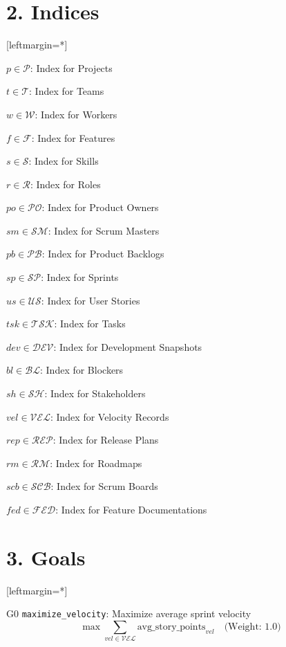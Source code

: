 \documentclass[12pt]{article}
\begin{document}
\section{2. Indices}
[leftmargin=*]
    \item $ p \in \mathcal{P} $: Index for Projects
    \item $ t \in \mathcal{T} $: Index for Teams
    \item $ w \in \mathcal{W} $: Index for Workers
    \item $ f \in \mathcal{F} $: Index for Features
    \item $ s \in \mathcal{S} $: Index for Skills
    \item $ r \in \mathcal{R} $: Index for Roles
    \item $ po \in \mathcal{PO} $: Index for Product Owners
    \item $ sm \in \mathcal{SM} $: Index for Scrum Masters
    \item $ pb \in \mathcal{PB} $: Index for Product Backlogs
    \item $ sp \in \mathcal{SP} $: Index for Sprints
    \item $ us \in \mathcal{US} $: Index for User Stories
    \item $ tsk \in \mathcal{TSK} $: Index for Tasks
    \item $ dev \in \mathcal{DEV} $: Index for Development Snapshots
    \item $ bl \in \mathcal{BL} $: Index for Blockers
    \item $ sh \in \mathcal{SH} $: Index for Stakeholders
    \item $ vel \in \mathcal{VEL} $: Index for Velocity Records
    \item $ rep \in \mathcal{REP} $: Index for Release Plans
    \item $ rm \in \mathcal{RM} $: Index for Roadmaps
    \item $ scb \in \mathcal{SCB} $: Index for Scrum Boards
    \item $ fed \in \mathcal{FED} $: Index for Feature Documentations

\section{3. Goals}
[leftmargin=*]
    \item[G0] \texttt{maximize\_velocity}: Maximize average sprint velocity
    \[
    \max \sum_{vel \in \mathcal{VEL}} \text{avg\_story\_points}_{vel} \quad \text{(Weight: 1.0)}
    \]
\end{document}
